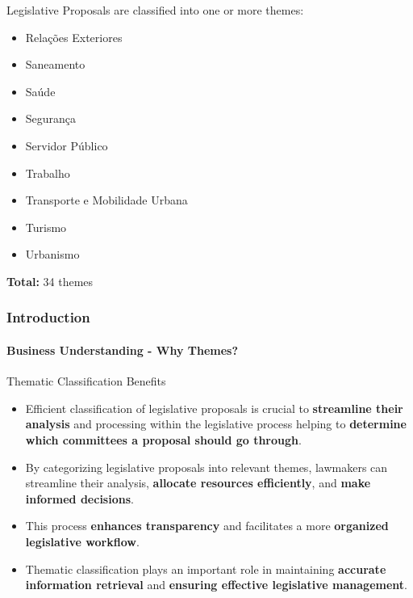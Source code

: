 \begin{frame}
\begin{exampleblock}{Legislative Proposals are classified into one or more themes:}
\begin{multicols}{3}
\begin{itemize}
				\item Relações Exteriores
				\item Saneamento
				\item Saúde
				\item Segurança
				\item Servidor Público
				\item Trabalho
				\item Transporte e Mobilidade Urbana
				\item Turismo
				\item Urbanismo
				\normalsize
			\end{itemize}
		\end{multicols}
		\textbf{Total:} 34 themes	
	\end{exampleblock}
\end{frame}
\begin{frame}
	\frametitle{Introduction}
	\framesubtitle{Business Understanding - Why Themes?}
	\begin{block}{Thematic Classification Benefits} %
		\begin{itemize}
			\item Efficient classification of legislative proposals is crucial to \textbf{streamline their analysis} and processing within the legislative process helping to \textbf{determine which committees a proposal should go through}.
					
							

			\item By categorizing legislative proposals into relevant themes, lawmakers can streamline their analysis, \textbf{allocate resources efficiently}, and \textbf{make informed decisions}. 


			\item This process \textbf{enhances transparency} and facilitates a more \textbf{organized legislative workflow}.	

					
			\item Thematic classification plays an important role in maintaining \textbf{accurate information retrieval} and \textbf{ensuring effective legislative management}.
			
				
		\end{itemize}
	\end{block}
\end{frame}
